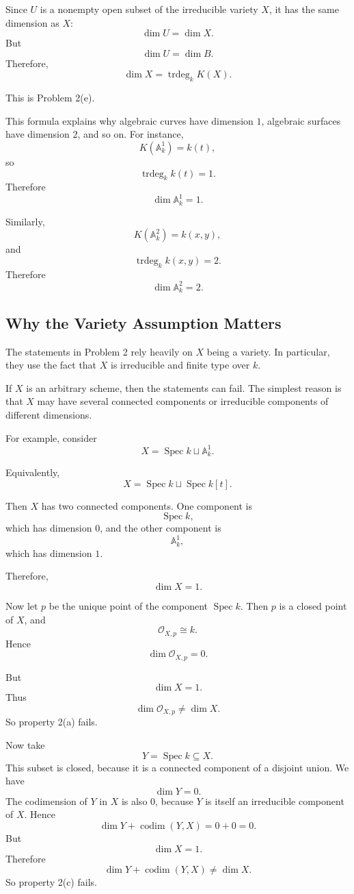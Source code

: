 \documentclass[12pt,a4paper]{article}
\DeclareMathOperator{\Spec}{Spec}
\newcommand{\codim}{\operatorname{codim}}
\newcommand{\trdeg}{\operatorname{trdeg}}
\providecommand{\Spec}{\operatorname{Spec}}
\theoremstyle{notespace}
\begin{document}
Since \(U\) is a nonempty open subset of the irreducible variety \(X\), it has the same dimension as \(X\):
\[
\dim U=\dim X.
\]
But
\[
\dim U=\dim B.
\]
Therefore,
\[
\boxed{
	\dim X=\trdeg_k K(X).
}
\]

This is Problem 2(e).

This formula explains why algebraic curves have dimension \(1\), algebraic surfaces have dimension \(2\), and so on. For instance,
\[
K(\mathbb A^1_k)=k(t),
\]
so
\[
\trdeg_k k(t)=1.
\]
Therefore
\[
\dim \mathbb A^1_k=1.
\]

Similarly,
\[
K(\mathbb A^2_k)=k(x,y),
\]
and
\[
\trdeg_k k(x,y)=2.
\]
Therefore
\[
\dim \mathbb A^2_k=2.
\]

\subsection{Why the Variety Assumption Matters}

The statements in Problem 2 rely heavily on \(X\) being a variety. In particular, they use the fact that \(X\) is irreducible and finite type over \(k\).

If \(X\) is an arbitrary scheme, then the statements can fail. The simplest reason is that \(X\) may have several connected components or irreducible components of different dimensions.

For example, consider
\[
X=\Spec k\sqcup \mathbb A^1_k.
\]

Equivalently,
\[
X=\Spec k\sqcup \Spec k[t].
\]

Then \(X\) has two connected components. One component is
\[
\Spec k,
\]
which has dimension \(0\), and the other component is
\[
\mathbb A^1_k,
\]
which has dimension \(1\).

Therefore,
\[
\dim X=1.
\]

Now let \(p\) be the unique point of the component \(\Spec k\). Then \(p\) is a closed point of \(X\), and
\[
\mathcal O_{X,p}\cong k.
\]
Hence
\[
\dim \mathcal O_{X,p}=0.
\]

But
\[
\dim X=1.
\]
Thus
\[
\dim \mathcal O_{X,p}\neq \dim X.
\]
So property 2(a) fails.

Now take
\[
Y=\Spec k\subseteq X.
\]
This subset is closed, because it is a connected component of a disjoint union. We have
\[
\dim Y=0.
\]
The codimension of \(Y\) in \(X\) is also \(0\), because \(Y\) is itself an irreducible component of \(X\). Hence
\[
\dim Y+\codim(Y,X)=0+0=0.
\]
But
\[
\dim X=1.
\]
Therefore
\[
\dim Y+\codim(Y,X)\neq \dim X.
\]
So property 2(c) fails.
\end{document}
